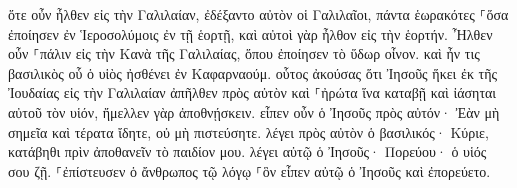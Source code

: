 \documentclass{openreader}
\begin{document}
ὅτε οὖν ἦλθεν εἰς τὴν Γαλιλαίαν, ἐδέξαντο αὐτὸν οἱ Γαλιλαῖοι, πάντα ἑωρακότες ⸀ὅσα ἐποίησεν ἐν Ἱεροσολύμοις ἐν τῇ ἑορτῇ, καὶ αὐτοὶ γὰρ ἦλθον εἰς τὴν ἑορτήν. 
Ἦλθεν οὖν ⸀πάλιν εἰς τὴν Κανὰ τῆς Γαλιλαίας, ὅπου ἐποίησεν τὸ ὕδωρ οἶνον. καὶ ἦν τις βασιλικὸς οὗ ὁ υἱὸς ἠσθένει ἐν Καφαρναούμ. 
οὗτος ἀκούσας ὅτι Ἰησοῦς ἥκει ἐκ τῆς Ἰουδαίας εἰς τὴν Γαλιλαίαν ἀπῆλθεν πρὸς αὐτὸν καὶ ⸀ἠρώτα ἵνα καταβῇ καὶ ἰάσηται αὐτοῦ τὸν υἱόν, ἤμελλεν γὰρ ἀποθνῄσκειν. 
εἶπεν οὖν ὁ Ἰησοῦς πρὸς αὐτόν· Ἐὰν μὴ σημεῖα καὶ τέρατα ἴδητε, οὐ μὴ πιστεύσητε. 
λέγει πρὸς αὐτὸν ὁ βασιλικός· Κύριε, κατάβηθι πρὶν ἀποθανεῖν τὸ παιδίον μου. 
λέγει αὐτῷ ὁ Ἰησοῦς· Πορεύου· ὁ υἱός σου ζῇ. ⸀ἐπίστευσεν ὁ ἄνθρωπος τῷ λόγῳ ⸀ὃν εἶπεν αὐτῷ ὁ Ἰησοῦς καὶ ἐπορεύετο. 
\end{document}
